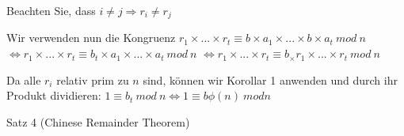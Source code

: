 \documentclass[a4paper]{article}
\begin{document}
\begin{multicols}{3}
\begin{itemize*}
            \begin{itemize*}
                  \item Beachten Sie, dass $i\not= j \Rightarrow r_i\not= r_j$%
                  \item Wir verwenden nun die Kongruenz $r_1\times ...\times r_t\equiv b\times a_1\times ...\times b\times a_t\ mod\ n$ $\Leftrightarrow r_1\times ...\times r_t\equiv b_t\times a_1\times ...\times a_t\ mod\ n$ $\Leftrightarrow r_1\times ...\times r_t\equiv b_\times r_1\times ...\times r_t\ mod\ n$
                  \item Da alle $r_i$ relativ prim zu $n$ sind, können wir Korollar 1 anwenden und durch ihr Produkt dividieren: $1\equiv b_t\ mod\ n \Leftrightarrow 1\equiv b\phi(n)\ mod n$
            \end{itemize*}
            \item Satz 4 (Chinese Remainder Theorem)

\end{itemize*}
\end{multicols}
\end{document}
